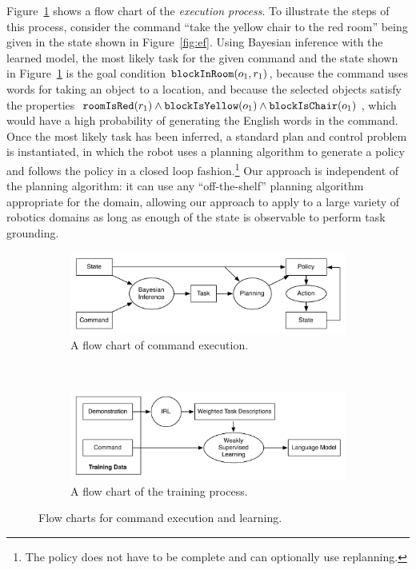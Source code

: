 \documentclass[conference]{IEEEtran}
\begin{document}
Figure~\ref{fig:execute} shows a flow chart of the \emph{execution process}. To illustrate the steps of this process, consider the command ``take the yellow chair to the red room'' being given in the state shown in Figure~\ref{fig:ef}. Using Bayesian inference with the learned model, the most likely task for the given command and the state shown in Figure~\ref{fig:execute} is the goal condition ${\tt blockInRoom}(o_1, r_1)$, because the command uses words for taking an object to a location, and because the selected objects satisfy the properties ${\tt roomIsRed}(r_1) \land {\tt blockIsYellow}(o_1) \land {\tt blockIsChair}(o_1)$, which would have a high probability of generating the English words in the command. Once the most likely task has been inferred, a standard plan and control problem is instantiated, in which the robot uses a planning algorithm to generate a policy and follows the policy in a closed loop fashion.\footnote{The policy does not have to be complete and can optionally use replanning.} Our approach is independent of the planning algorithm: it can use any ``off-the-shelf'' planning algorithm appropriate for the domain, allowing our approach to apply to a large variety of robotics domains as long as enough of the state is observable to perform task grounding.

\begin{figure}
        \centering
        \begin{subfigure}[b]{\columnwidth}
                \includegraphics[width=\textwidth]{images/executeFlow}
                \caption{\small A flow chart of command execution.}
                \label{fig:execute}
        \end{subfigure}%
        \\
        \begin{subfigure}[b]{\columnwidth}
                \includegraphics[width=\textwidth]{images/trainFlow}
                \caption{\small A flow chart of the training process.}
                \label{fig:learn}
        \end{subfigure}
        \caption{\small Flow charts for command execution and learning.}\label{fig:flow}
\end{figure}
\end{document}
